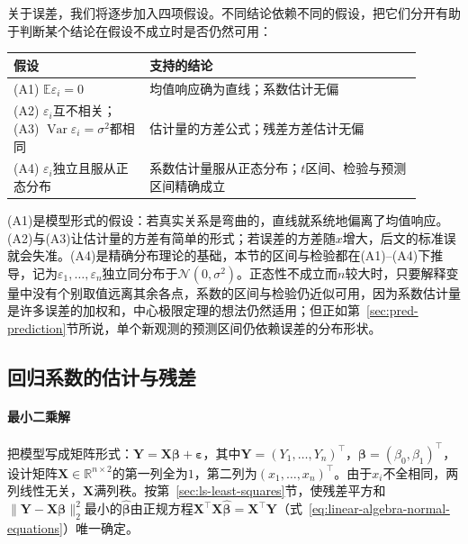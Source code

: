 关于误差，我们将逐步加入四项假设。不同结论依赖不同的假设，把它们分开有助于判断某个结论在假设不成立时是否仍然可用：
\begin{center}
\begin{tabular}{p{0.3\linewidth}p{0.6\linewidth}}
  \toprule
  假设 & 支持的结论\\
  \midrule
  (A1) $\mathbb E\varepsilon_i=0$ & 均值响应确为直线；系数估计无偏\\
  (A2) $\varepsilon_i$互不相关；\newline(A3) $\operatorname{Var}\varepsilon_i=\sigma^2$都相同 & 估计量的方差公式；残差方差估计无偏\\
  (A4) $\varepsilon_i$独立且服从正态分布 & 系数估计量服从正态分布；$t$区间、检验与预测区间精确成立\\
  \bottomrule
\end{tabular}
\end{center}
(A1)是模型形式的假设：若真实关系是弯曲的，直线就系统地偏离了均值响应。(A2)与(A3)让估计量的方差有简单的形式；若误差的方差随$x$增大，后文的标准误就会失准。(A4)是精确分布理论的基础，本节的区间与检验都在(A1)--(A4)下推导，记为$\varepsilon_1,\dots,\varepsilon_n$独立同分布于$\mathcal N(0,\sigma^2)$。正态性不成立而$n$较大时，只要解释变量中没有个别取值远离其余各点，系数的区间与检验仍近似可用，因为系数估计量是许多误差的加权和，中心极限定理的想法仍然适用；但正如第~\ref{sec:pred-prediction}节所说，单个新观测的预测区间仍依赖误差的分布形状。

\subsection{回归系数的估计与残差}

\paragraph{最小二乘解}

把模型写成矩阵形式：$\bm Y=\bm X\bm\beta+\bm\varepsilon$，其中$\bm Y=(Y_1,\dots,Y_n)^\top$，$\bm\beta=(\beta_0,\beta_1)^\top$，设计矩阵$\bm X\in\mathbb R^{n\times2}$的第一列全为$1$，第二列为$(x_1,\dots,x_n)^\top$。由于$x_i$不全相同，两列线性无关，$\bm X$满列秩。按第~\ref{sec:ls-least-squares}节，使残差平方和$\lVert\bm Y-\bm X\bm\beta\rVert_2^2$最小的$\hat{\bm\beta}$由正规方程$\bm X^\top\bm X\hat{\bm\beta}=\bm X^\top\bm Y$（式~\eqref{eq:linear-algebra-normal-equations}）唯一确定。

